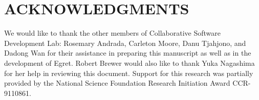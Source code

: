 \section{ACKNOWLEDGMENTS}

We would like to thank the other members of Collaborative Software Development
Lab: Rosemary Andrada, Carleton Moore, Danu Tjahjono, and Dadong Wan for their
assistance in preparing this manuscript as well as in the development of
Egret\cite{csdl-92-01}. Robert Brewer would also like to thank Yuka Nagashima
for her help in reviewing this document.
Support for this research was partially provided by the National Science
Foundation Research Initiation Award CCR-9110861.
